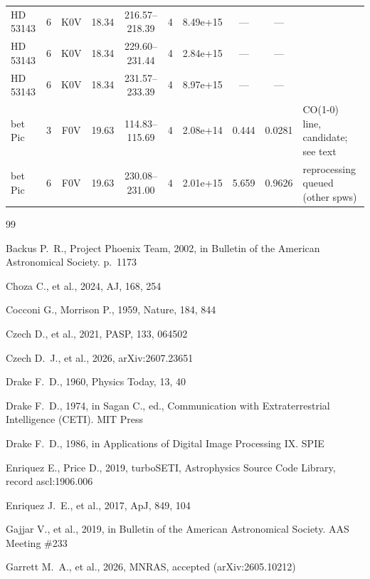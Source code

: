 \documentclass{openjournal}
\begin{document}
\begin{table}
\begin{tabularx}{\textwidth}{@{}l c c c c c c c c X@{}}
HD 53143 & 6 & K0V & 18.34 & 216.57--218.39 & 4 & 8.49e+15 & --- & --- &  \\
HD 53143 & 6 & K0V & 18.34 & 229.60--231.44 & 4 & 2.84e+15 & --- & --- &  \\
HD 53143 & 6 & K0V & 18.34 & 231.57--233.39 & 4 & 8.97e+15 & --- & --- &  \\
bet Pic & 3 & F0V & 19.63 & 114.83--115.69 & 4 & 2.08e+14 & 0.444 & 0.0281 & CO(1-0) line, candidate; see text \\
bet Pic & 6 & F0V & 19.63 & 230.08--231.00 & 4 & 2.01e+15 & 5.659 & 0.9626 & reprocessing queued (other spws) \\
\hline
\end{tabularx}
\end{table}

\begin{thebibliography}{99}

 Backus P.~R., Project Phoenix Team, 2002, in Bulletin of the American Astronomical Society. p.\ 1173

 Choza C., et al., 2024, AJ, 168, 254

 Cocconi G., Morrison P., 1959, Nature, 184, 844

 Czech D., et al., 2021, PASP, 133, 064502

 Czech D.~J., et al., 2026, arXiv:2607.23651

 Drake F.~D., 1960, Physics Today, 13, 40

 Drake F.~D., 1974, in Sagan C., ed., Communication with Extraterrestrial Intelligence (CETI). MIT Press

 Drake F.~D., 1986, in Applications of Digital Image Processing IX. SPIE

 Enriquez E., Price D., 2019, turboSETI, Astrophysics Source Code Library, record ascl:1906.006

 Enriquez J.~E., et al., 2017, ApJ, 849, 104

 Gajjar V., et al., 2019, in Bulletin of the American Astronomical Society. AAS Meeting \#233

 Garrett M.~A., et al., 2026, MNRAS, accepted (arXiv:2605.10212)


\end{thebibliography}
\end{document}
